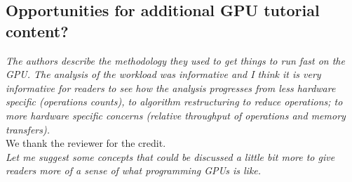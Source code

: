 \documentclass[11pt]{article} %
\newcommand\1{\vec 1}
\newcommand\q[1]{\textit{#1}}
\newcommand\ans[1]{#1}
\begin{document}
\subsection{Opportunities for additional GPU tutorial content?}

\q{The authors describe the methodology they used to get things to run fast on the GPU. The analysis of the workload was informative and I think it is very informative for readers to see how the analysis progresses from less hardware specific (operations counts), to algorithm restructuring to reduce operations; to more hardware specific concerns (relative throughput of operations and memory transfers).}\\[.5\baselineskip] 
\ans{We thank the reviewer for the credit.}\\[-.5\baselineskip] 

\q{Let me suggest some concepts that could be discussed a little bit more to give readers more of a sense of what programming GPUs is like.}
\end{document}
